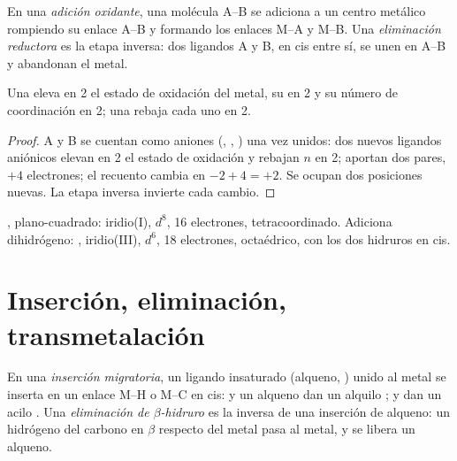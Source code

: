\begin{definition}\label{def:b2:catalytic-cycles:oxidative-addition}
En una \emph{adición oxidante}, una molécula A--B se adiciona a un
centro metálico rompiendo su enlace A--B y formando los enlaces M--A y M--B. Una
\emph{eliminación reductora} es la etapa inversa: dos
ligandos A y B, en cis entre sí, se unen en A--B y abandonan el metal.
\end{definition}

\begin{proposition}\label{prop:b2:catalytic-cycles:oa}
Una  eleva en 2 el estado de oxidación del metal, su 
en 2 y su número de coordinación en 2; una  rebaja cada uno en 2.
\end{proposition}

\begin{proof}
A y B se cuentan como aniones (, , ) una vez unidos: dos nuevos ligandos
aniónicos elevan en 2 el estado de oxidación y rebajan $n$ en 2; aportan dos pares, $+4$
electrones; el recuento cambia en $-2 + 4 = +2$. Se ocupan dos posiciones nuevas. La
etapa inversa invierte cada cambio.
\end{proof}

\begin{example}\label{ex:b2:catalytic-cycles:vaska}
, plano-cuadrado: iridio(I), $d^8$, 16 electrones, tetracoordinado.
Adiciona dihidrógeno: , iridio(III), $d^6$, 18 electrones, octaédrico,
con los dos hidruros en cis.
\end{example}

\section{Inserción, eliminación, transmetalación}

\begin{definition}\label{def:b2:catalytic-cycles:insertion}
En una \emph{inserción migratoria}, un ligando insaturado
(alqueno, ) unido al metal se inserta en un enlace M--H o M--C en cis:  y un
alqueno dan un alquilo ;  y  dan un acilo .
Una \emph{eliminación de $\beta$-hidruro}
es la inversa de una inserción de alqueno: un hidrógeno del carbono en $\beta$ respecto del
metal pasa al metal, y se libera un alqueno.
\end{definition}

